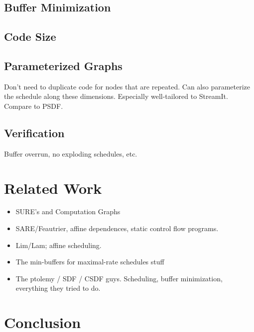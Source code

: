 \subsection{Buffer Minimization}

\subsection{Code Size}

\subsection{Parameterized Graphs}

Don't need to duplicate code for nodes that are repeated.  Can also
parameterize the schedule along these dimensions.  Especially
well-tailored to StreamIt.  Compare to PSDF.

\subsection{Verification}

Buffer overrun, no exploding schedules, etc.

\section{Related Work}

\begin{itemize}

\item SURE's and Computation Graphs

\item SARE/Feautrier, affine dependences, static control flow programs.

\item Lim/Lam; affine scheduling.

\item The min-buffers for maximal-rate schedules stuff

\item The ptolemy / SDF / CSDF guys.  Scheduling, buffer minimization,
everything they tried to do.

\end{itemize}

\section{Conclusion}

